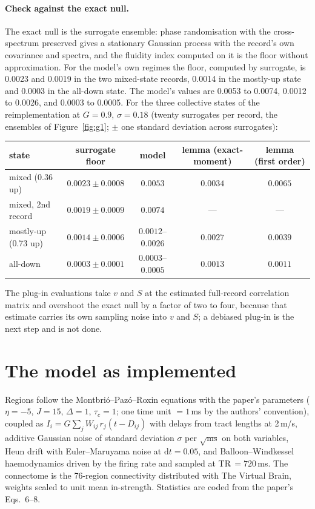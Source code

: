 \documentclass[11pt]{article}
\theoremstyle{definition}\newtheorem{observation}{Observation}
\theoremstyle{remark}\newtheorem{remark}{Remark}
\begin{document}
\paragraph{Check against the exact null.} The exact null is the surrogate ensemble: phase randomisation with the cross-spectrum preserved gives a stationary Gaussian process with the record's own covariance and spectra, and the fluidity index computed on it is the floor without approximation. For the model's own regimes the floor, computed by surrogate, is 0.0023 and 0.0019 in the two mixed-state records, 0.0014 in the mostly-up state and 0.0003 in the all-down state. The model's values are 0.0053 to 0.0074, 0.0012 to 0.0026, and 0.0003 to 0.0005. For the three collective states of the reimplementation at $G=0.9$, $\sigma=0.18$ (twenty surrogates per record, the ensembles of Figure~\ref{fig:g1}; $\pm$ one standard deviation across surrogates):
\begin{center}\footnotesize
\begin{tabular}{@{}lcccc@{}}
\toprule
state & surrogate floor & model & lemma (exact-moment) & lemma (first order) \\
\midrule
mixed (0.36 up) & $0.0023\pm0.0008$ & $0.0053$ & $0.0034$ & $0.0065$ \\
mixed, 2nd record & $0.0019\pm0.0009$ & $0.0074$ & --- & --- \\
mostly-up (0.73 up) & $0.0014\pm0.0006$ & $0.0012$--$0.0026$ & $0.0027$ & $0.0039$ \\
all-down & $0.0003\pm0.0001$ & $0.0003$--$0.0005$ & $0.0013$ & $0.0011$ \\
\bottomrule
\end{tabular}
\end{center}
The plug-in evaluations take $v$ and $S$ at the estimated full-record correlation matrix and overshoot the exact null by a factor of two to four, because that estimate carries its own sampling noise into $v$ and $S$; a debiased plug-in is the next step and is not done.

\section{The model as implemented}
Regions follow the Montbri\'o--Paz\'o--Roxin equations with the paper's parameters ($\eta=-5$, $J=15$, $\Delta=1$, $\tau_c=1$; one time unit $=1$\,ms by the authors' convention), coupled as $I_i=G\sum_j W_{ij}\,r_j(t-D_{ij})$ with delays from tract lengths at 2\,m/s, additive Gaussian noise of standard deviation $\sigma$ per $\sqrt{\text{ms}}$ on both variables, Heun drift with Euler--Maruyama noise at $\mathrm{d}t=0.05$, and Balloon--Windkessel haemodynamics driven by the firing rate and sampled at TR\,$=720$\,ms. The connectome is the 76-region connectivity distributed with The Virtual Brain, weights scaled to unit mean in-strength. Statistics are coded from the paper's Eqs.~6--8.
\end{document}
